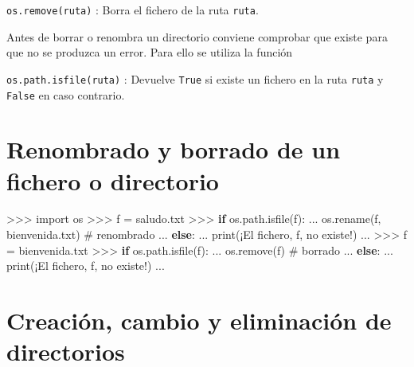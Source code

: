 \documentclass[
  spanish,
  a4paper,
]{scrreport}
\newenvironment{Shaded}{\begin{snugshade}}{\end{snugshade}}
\newcommand{\BuiltInTok}[1]{\textcolor[rgb]{0.00,0.23,0.31}{#1}}
\newcommand{\CommentTok}[1]{\textcolor[rgb]{0.37,0.37,0.37}{#1}}
\newcommand{\ControlFlowTok}[1]{\textcolor[rgb]{0.00,0.23,0.31}{\textbf{#1}}}
\newcommand{\ImportTok}[1]{\textcolor[rgb]{0.00,0.46,0.62}{#1}}
\newcommand{\NormalTok}[1]{\textcolor[rgb]{0.00,0.23,0.31}{#1}}
\newcommand{\OperatorTok}[1]{\textcolor[rgb]{0.37,0.37,0.37}{#1}}
\newcommand{\StringTok}[1]{\textcolor[rgb]{0.13,0.47,0.30}{#1}}
\begin{document}
\texttt{os.remove(ruta)} : Borra el fichero de la ruta \texttt{ruta}.

Antes de borrar o renombra un directorio conviene comprobar que existe
para que no se produzca un error. Para ello se utiliza la función

\texttt{os.path.isfile(ruta)} : Devuelve \texttt{True} si existe un
fichero en la ruta \texttt{ruta} y \texttt{False} en caso contrario.

\section{Renombrado y borrado de un fichero o
directorio}\label{renombrado-y-borrado-de-un-fichero-o-directorio}

\begin{Shaded}
\begin{Highlighting}[]
\OperatorTok{\textgreater{}\textgreater{}\textgreater{}} \ImportTok{import}\NormalTok{ os}
\OperatorTok{\textgreater{}\textgreater{}\textgreater{}}\NormalTok{ f }\OperatorTok{=} \StringTok{\textquotesingle{}saludo.txt\textquotesingle{}}
\OperatorTok{\textgreater{}\textgreater{}\textgreater{}} \ControlFlowTok{if}\NormalTok{ os.path.isfile(f):}
\NormalTok{...     os.rename(f, }\StringTok{\textquotesingle{}bienvenida.txt\textquotesingle{}}\NormalTok{) }\CommentTok{\# renombrado}
\NormalTok{... }\ControlFlowTok{else}\NormalTok{:}
\NormalTok{...     }\BuiltInTok{print}\NormalTok{(}\StringTok{\textquotesingle{}¡El fichero\textquotesingle{}}\NormalTok{, f, }\StringTok{\textquotesingle{}no existe!\textquotesingle{}}\NormalTok{)}
\NormalTok{...}
\OperatorTok{\textgreater{}\textgreater{}\textgreater{}}\NormalTok{ f }\OperatorTok{=} \StringTok{\textquotesingle{}bienvenida.txt\textquotesingle{}}
\OperatorTok{\textgreater{}\textgreater{}\textgreater{}} \ControlFlowTok{if}\NormalTok{ os.path.isfile(f):}
\NormalTok{...     os.remove(f) }\CommentTok{\# borrado}
\NormalTok{... }\ControlFlowTok{else}\NormalTok{:}
\NormalTok{...     }\BuiltInTok{print}\NormalTok{(}\StringTok{\textquotesingle{}¡El fichero\textquotesingle{}}\NormalTok{, f, }\StringTok{\textquotesingle{}no existe!\textquotesingle{}}\NormalTok{)}
\NormalTok{...}
\end{Highlighting}
\end{Shaded}

\section{Creación, cambio y eliminación de
directorios}\label{creaciuxf3n-cambio-y-eliminaciuxf3n-de-directorios}
\end{document}

